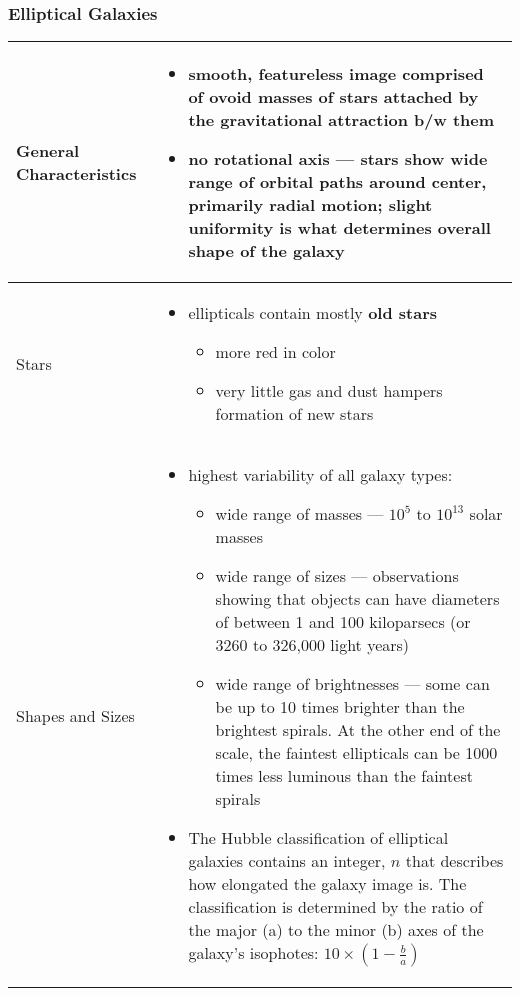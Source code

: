 \subsubsection{Elliptical Galaxies}
\begin{longtabu} to 
\hline
	General Characteristics &
	\begin{itemize}[noitemsep]
		\item smooth, featureless image comprised of ovoid masses of stars attached by the gravitational attraction b/w them
		\item no rotational axis --- stars show wide range of orbital paths around center, primarily radial motion; slight uniformity is what determines overall shape of the galaxy
	\end{itemize}
	\\
	\hline
	Stars &
	\begin{itemize}[noitemsep]
		\item ellipticals contain mostly \textbf{old stars}
			\begin{itemize}[noitemsep]
				\item more red in color
				\item very little gas and dust hampers formation of new stars
			\end{itemize}
	\end{itemize}
	\\
	\hline
	Shapes and Sizes &
	\begin{itemize}[noitemsep]
		\item highest variability of all galaxy types:
			\begin{itemize}[noitemsep]
				\item wide range of masses --- $10^{5}$ to $10^{13}$ solar masses
				\item wide range of sizes --- observations showing that objects can have diameters of between 1 and 100 kiloparsecs (or 3260 to 326,000 light years)
				\item wide range of brightnesses --- some can be up to 10 times brighter than the brightest spirals. At the other end of the scale, the faintest ellipticals can be 1000 times less luminous than the faintest spirals
			\end{itemize}
		\item The Hubble classification of elliptical galaxies contains an integer, $n$ that describes how elongated the galaxy image is. The classification is determined by the ratio of the major (a) to the minor (b) axes of the galaxy's \gls{isophote}s: $ 10 \times (1 - \frac{b}{a}) $

\end{itemize}
\end{longtabu}
